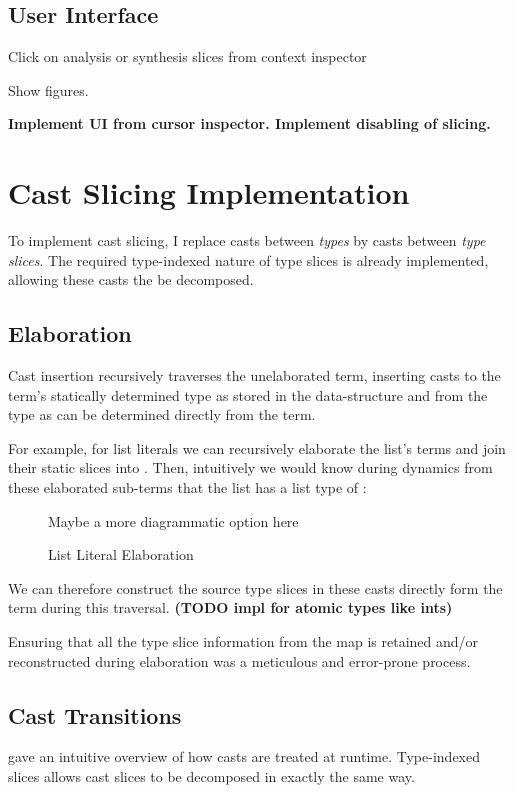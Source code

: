 \subsection{User Interface}
Click on analysis or synthesis slices from context inspector

Show figures.

\textbf{Implement UI from cursor inspector. Implement disabling of slicing.}

\section{Cast Slicing Implementation}\label{sec:CastSlicingImplementation}
To implement cast slicing, I replace casts between \textit{types} by casts between \textit{type slices}. The required type-indexed nature of type slices is already implemented, allowing these casts the be decomposed.

\subsection{Elaboration}\label{sec:Elaboration}
Cast insertion recursively traverses the unelaborated term, inserting casts to the term's statically determined type as stored in the  data-structure and from the type as can be determined directly from the term. 

For example, for list literals we can recursively elaborate the list's terms and join their static slices into . Then, intuitively we would know during dynamics from these elaborated sub-terms that the list has a list type of :
\begin{figure}[h]
Maybe a more diagrammatic option here
\caption{List Literal Elaboration}
\end{figure}

We can therefore construct the source type slices in these casts directly form the term during this traversal. \textbf{(TODO impl for atomic types like ints)}

Ensuring that all the type slice information from the  map is retained and/or reconstructed during elaboration was a meticulous and error-prone process.

\subsection{Cast Transitions}
 gave an intuitive overview of how casts are treated at runtime. Type-indexed slices allows cast slices to be decomposed in exactly the same way. 

